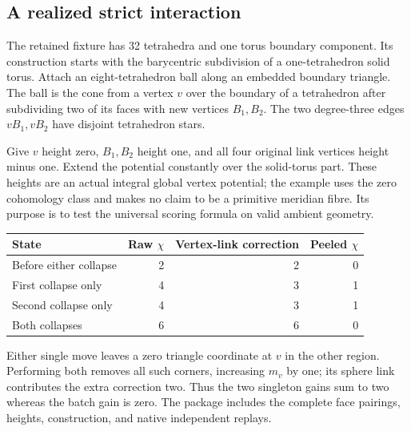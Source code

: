 \subsection{A realized strict interaction}

The retained fixture has 32 tetrahedra and one torus boundary component.
Its construction starts with the barycentric subdivision of a
one-tetrahedron solid torus. Attach an eight-tetrahedron ball along an
embedded boundary triangle. The ball is the cone from a vertex $v$ over
the boundary of a tetrahedron after subdividing two of its faces with
new vertices $B_1,B_2$. The two degree-three edges $vB_1,vB_2$ have
disjoint tetrahedron stars.

Give $v$ height zero, $B_1,B_2$ height one, and all four original link
vertices height minus one. Extend the potential constantly over the
solid-torus part. These heights are an actual integral global vertex
potential; the example uses the zero cohomology class and makes no
claim to be a primitive meridian fibre. Its purpose is to test the
universal scoring formula on valid ambient geometry.

\begin{center}
\begin{tabular}{lrrr}
\toprule
State & Raw $\chi$ & Vertex-link correction & Peeled $\chi$\\
\midrule
Before either collapse & 2 & 2 & 0\\
First collapse only & 4 & 3 & 1\\
Second collapse only & 4 & 3 & 1\\
Both collapses & 6 & 6 & 0\\
\bottomrule
\end{tabular}
\end{center}

Either single move leaves a zero triangle coordinate at $v$ in the
other region. Performing both removes all such corners, increasing
$m_v$ by one; its sphere link contributes the extra correction two.
Thus the two singleton gains sum to two whereas the batch gain is
zero. The package includes the complete face pairings, heights,
construction, and native independent replays.


